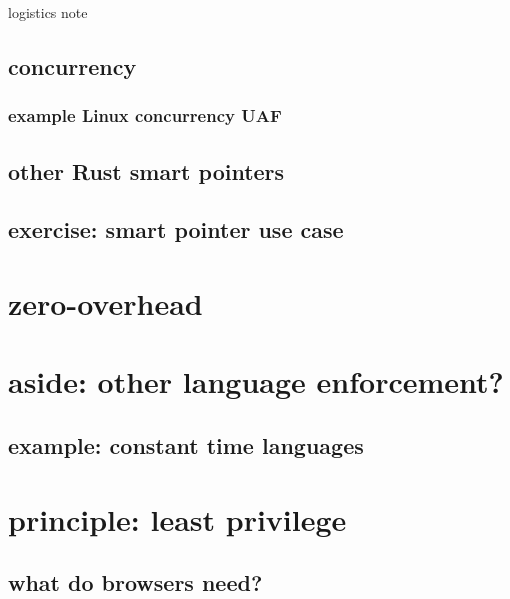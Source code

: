 \begin{frame}{logistics note}
\end{frame}

\subsection{concurrency}



\subsubsection{example Linux concurrency UAF}


\subsection{other Rust smart pointers}


\subsection{exercise: smart pointer use case}


\section{zero-overhead}


\section{aside: other language enforcement?}


\subsection{example: constant time languages}


\section{principle: least privilege}


\subsection{what do browsers need?}


